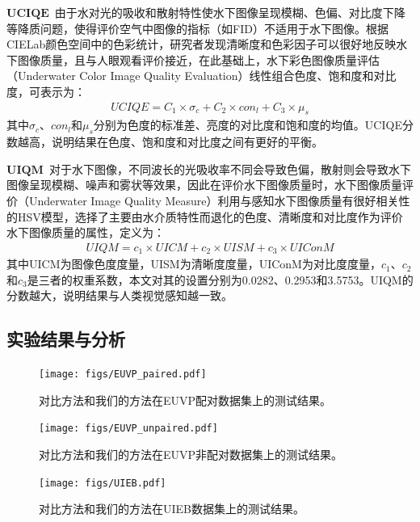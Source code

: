 $\mathbf{UCIQE}$~由于水对光的吸收和散射特性使水下图像呈现模糊、色偏、对比度下降等降质问题，使得评价空气中图像的指标（如FID）不适用于水下图像。根据CIELab颜色空间中的色彩统计，研究者发现清晰度和色彩因子可以很好地反映水下图像质量，且与人眼观看评价接近，在此基础上，水下彩色图像质量评估\cite{yang2015underwater}（Underwater Color Image Quality Evaluation）线性组合色度、饱和度和对比度，可表示为：
\begin{equation}
\begin{split}
UCIQE=C_1\times\sigma_c+C_2\times con_l+C_3\times\mu_s
\end{split}
\label{eq:example}
\end{equation}
其中$\sigma_c$、$con_l$和$\mu_s$分别为色度的标准差、亮度的对比度和饱和度的均值。UCIQE分数越高，说明结果在色度、饱和度和对比度之间有更好的平衡。

$\mathbf{UIQM}$~对于水下图像，不同波长的光吸收率不同会导致色偏，散射则会导致水下图像呈现模糊、噪声和雾状等效果，因此在评价水下图像质量时，水下图像质量评价\cite{panetta2015human}（Underwater Image Quality Measure）利用与感知水下图像质量有很好相关性的HSV模型，选择了主要由水介质特性而退化的色度、清晰度和对比度作为评价水下图像质量的属性，定义为：
\begin{equation}
\begin{split}
UIQM=c_1\times UICM+c_2\times UISM+c_3\times UIConM
\end{split}
\label{eq:example}
\end{equation}
其中UICM为图像色度度量，UISM为清晰度度量，UIConM为对比度度量，$c_1$、$c_2$和$c_3$是三者的权重系数，本文对其的设置分别为0.0282、0.2953和3.5753。UIQM的分数越大，说明结果与人类视觉感知越一致。

\subsection{实验结果与分析}

\begin{figure}
    \centering
	\texttt{[image: figs/EUVP\_paired.pdf]}
	\caption{对比方法和我们的方法在EUVP配对数据集上的测试结果。}
	\label{fig:euvp_paired}
\end{figure}

\begin{figure}
    \centering
	\texttt{[image: figs/EUVP\_unpaired.pdf]}
	\caption{对比方法和我们的方法在EUVP非配对数据集上的测试结果。}
	\label{fig:euvp_unpaired}
\end{figure}

\begin{figure}
    \centering
	\texttt{[image: figs/UIEB.pdf]}
	\caption{对比方法和我们的方法在UIEB数据集上的测试结果。}
	\label{fig:UIEB}
\end{figure}

